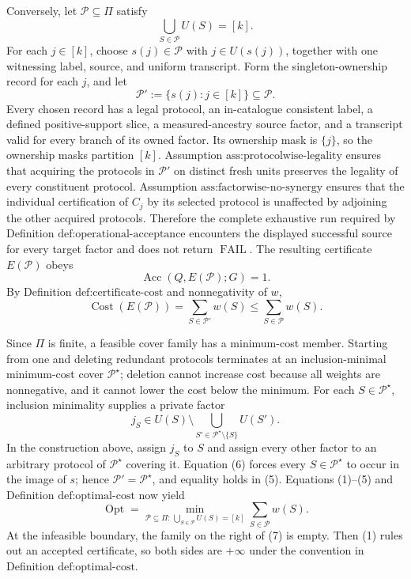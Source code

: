 Conversely, let \(\mathcal P\subseteq\Pi\) satisfy
\[
 \bigcup_{S\in\mathcal P}U(S)=[k].
\tag{3}
\]
For each \(j\in[k]\), choose \(s(j)\in\mathcal P\) with \(j\in U(s(j))\), together with one witnessing label, source, and uniform transcript.  Form the singleton-ownership record for each \(j\), and let
\[
 \mathcal P':=\{s(j):j\in[k]\}\subseteq\mathcal P.
\]
Every chosen record has a legal protocol, an in-catalogue consistent label, a defined positive-support slice, a measured-ancestry source factor, and a transcript valid for every branch of its owned factor.  Its ownership mask is \(\{j\}\), so the ownership masks partition \([k]\).  Assumption \(\text{ass:protocolwise-legality}\) ensures that acquiring the protocols in \(\mathcal P'\) on distinct fresh units preserves the legality of every constituent protocol.  Assumption \(\text{ass:factorwise-no-synergy}\) ensures that the individual certification of \(C_j\) by its selected protocol is unaffected by adjoining the other acquired protocols.  Therefore the complete exhaustive run required by Definition \(\text{def:operational-acceptance}\) encounters the displayed successful source for every target factor and does not return \(\operatorname{FAIL}\).  The resulting certificate \(E(\mathcal P)\) obeys
\[
 \operatorname{Acc}(Q,E(\mathcal P);G)=1.
\tag{4}
\]
By Definition \(\text{def:certificate-cost}\) and nonnegativity of \(w\),
\[
 \operatorname{Cost}(E(\mathcal P))
 =\sum_{S\in\mathcal P'}w(S)
 \leq \sum_{S\in\mathcal P}w(S).
\tag{5}
\]

Since \(\Pi\) is finite, a feasible cover family has a minimum-cost member.  Starting from one and deleting redundant protocols terminates at an inclusion-minimal minimum-cost cover \(\mathcal P^{\star}\); deletion cannot increase cost because all weights are nonnegative, and it cannot lower the cost below the minimum.  For each \(S\in\mathcal P^{\star}\), inclusion minimality supplies a private factor
\[
 j_S\in U(S)\setminus
 \bigcup_{S'\in\mathcal P^{\star}\setminus\{S\}}U(S').
\tag{6}
\]
In the construction above, assign \(j_S\) to \(S\) and assign every other factor to an arbitrary protocol of \(\mathcal P^{\star}\) covering it.  Equation (6) forces every \(S\in\mathcal P^{\star}\) to occur in the image of \(s\); hence \(\mathcal P'=\mathcal P^{\star}\), and equality holds in (5).  Equations (1)--(5) and Definition \(\text{def:optimal-cost}\) now yield
\[
 \operatorname{Opt}
 =\min_{\mathcal P\subseteq\Pi:\,\bigcup_{S\in\mathcal P}U(S)=[k]}
   \sum_{S\in\mathcal P}w(S).
\tag{7}
\]
At the infeasible boundary, the family on the right of (7) is empty.  Then (1) rules out an accepted certificate, so both sides are \(+\infty\) under the convention in Definition \(\text{def:optimal-cost}\).


